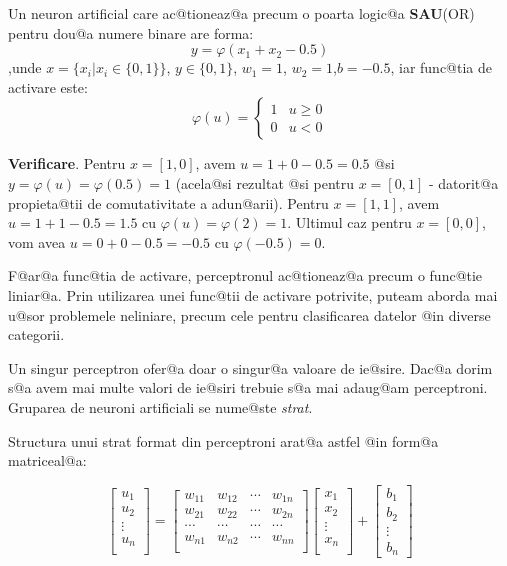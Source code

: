 \begin{exemplu}

	Un neuron artificial care ac@tioneaz@a precum o poarta logic@a {\bf SAU}(OR) pentru dou@a numere binare are forma:
$$
	y = \varphi ( x_1 + x_2 - 0.5 )
$$
,unde $x = \{ x_i | x_i \in \{0, 1\} \}$, $y \in \{0, 1\}$, $w_1 = 1$, $w_2 = 1$,$b = -0.5$, iar func@tia de activare este: 
$$
	\varphi ( u ) = \left\lbrace
		\begin{array}{lc}
			1 & u \geq 0 \\
			0 & u < 0
		\end{array}
	\right.
$$
\end{exemplu}

{\bf Verificare}. Pentru $x = [1, 0]$, avem $u = 1 + 0 - 0.5 = 0.5$ @si $y = \varphi(u) = \varphi(0.5) = 1$ (acela@si rezultat @si pentru $x = [0, 1]$ - datorit@a propieta@tii de comutativitate a adun@arii).
Pentru $x = [1, 1]$, avem $u = 1 + 1 - 0.5 = 1.5$ cu $\varphi (u) = \varphi ( 2 ) = 1$. Ultimul caz pentru $x = [0, 0]$, vom avea $u = 0 + 0 - 0.5 = -0.5$ cu $\varphi (-0.5) = 0$.

\begin{observatia}
	F@ar@a func@tia de activare, perceptronul ac@tioneaz@a precum o func@tie liniar@a. Prin utilizarea unei func@tii de activare potrivite, puteam aborda mai u@sor problemele neliniare, precum cele pentru clasificarea datelor @in diverse categorii.
\end{observatia}

Un singur perceptron ofer@a doar o singur@a valoare de ie@sire. Dac@a dorim s@a avem mai multe valori de ie@siri trebuie s@a mai adaug@am perceptroni. Gruparea de neuroni artificiali se nume@ste {\sl strat}.

Structura unui strat format din perceptroni arat@a astfel @in form@a matriceal@a:

$$
	\begin{bmatrix}
		u_1 \\
		u_2 \\
		\vdots \\ 
		u_n \\
	\end{bmatrix}	
	= 
	\begin{bmatrix}
		w_{11} & w_{12} & \cdots & w_{1n} \\
		w_{21} & w_{22} & \cdots & w_{2n} \\
		\cdots & \cdots & \cdots & \cdots \\
		w_{n1} & w_{n2} & \cdots & w_{nn} \\
	\end{bmatrix}
	\begin{bmatrix}
		x_1 \\
		x_2 \\
		\vdots \\
		x_n \\
	\end{bmatrix}
	+
	\begin{bmatrix}
		b_1 \\
		b_2 \\
		\vdots \\
		b_n
	\end{bmatrix}
$$

